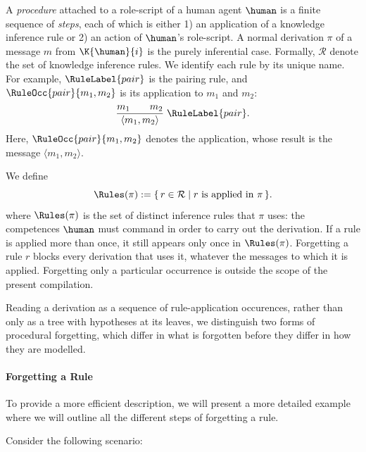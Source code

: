 \begin{definition}[Procedure]
\label{Def:Procedure}
A \emph{procedure} attached to a role-script of a human agent $\human$ is a finite sequence of \emph{steps}, each of which is either 1) an application of a knowledge inference rule or 2) an action of $\human$'s role-script. A normal derivation $\pi$ of a message $m$ from $\K{\human}{i}$ is the purely inferential case. Formally, $\mathcal R$ denote the set of knowledge inference rules. We identify each rule by its unique name. For example, $\RuleLabel{pair}$ is the pairing rule, and $\RuleOcc{pair}{m_1,m_2}$ is its application to $m_1$ and $m_2$:
\[
    \frac{m_1\qquad m_2}{\langle m_1,m_2\rangle}\;\RuleLabel{pair}.
\]
Here, $\RuleOcc{pair}{m_1,m_2}$ denotes the application, whose result is the message $\langle m_1,m_2\rangle$.

We define
\[
    \Rules(\pi):=\{\,r\in\mathcal R
       \mid r\text{ is applied in }\pi\,\}.
\]
where $\Rules(\pi)$ is the set of distinct inference rules that $\pi$ uses: the competences $\human$ must command in order to carry out the derivation. 
If a rule is applied more than once, it still appears only once in $\Rules(\pi)$. Forgetting a rule $r$ blocks every derivation that uses it, whatever the messages to which it is applied. Forgetting only a particular occurrence is outside the scope of the present compilation.
\end{definition}

Reading a derivation as a sequence of rule-application occurences, rather than only as a tree with hypotheses at its leaves, we distinguish two forms of procedural forgetting, which differ in what is forgotten before they differ in how they are modelled.

\paragraph{Forgetting a Rule}
To provide a more efficient description, we will present a more detailed example where we will outline all the different steps of forgetting a rule. 

Consider the following scenario: 
